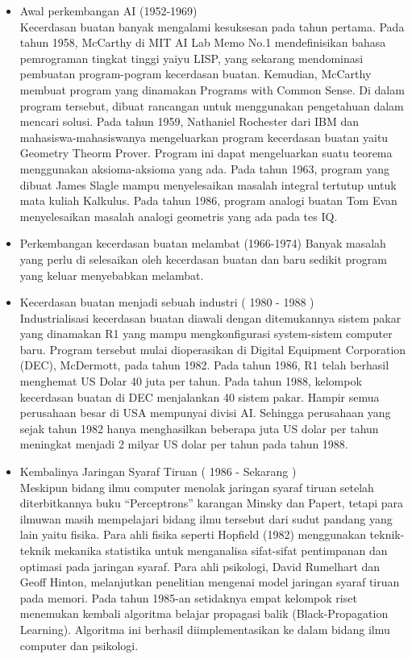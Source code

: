 \begin{enumerate}
\begin{itemize}
\item Awal perkembangan AI (1952-1969)\\
Kecerdasan buatan banyak mengalami kesuksesan pada tahun pertama. 
Pada tahun 1958, McCarthy di MIT AI Lab Memo No.1 mendefinisikan bahasa pemrograman tingkat tinggi yaiyu LISP, yang sekarang mendominasi pembuatan program-pogram kecerdasan buatan. Kemudian, McCarthy membuat program yang dinamakan Programs with Common Sense. Di dalam program tersebut, dibuat rancangan untuk menggunakan pengetahuan dalam mencari solusi.
Pada tahun 1959, Nathaniel Rochester dari IBM dan mahasiswa-mahasiswanya mengeluarkan program kecerdasan buatan yaitu Geometry Theorm Prover. Program ini dapat mengeluarkan suatu teorema menggunakan aksioma-aksioma yang ada.
Pada tahun 1963, program yang dibuat James Slagle mampu menyelesaikan masalah integral tertutup untuk mata kuliah Kalkulus.
Pada tahun 1986, program analogi buatan Tom Evan menyelesaikan masalah analogi geometris yang ada pada tes IQ.

\item Perkembangan kecerdasan buatan melambat (1966-1974)
Banyak masalah yang perlu di selesaikan oleh kecerdasan buatan dan baru sedikit program yang keluar menyebabkan melambat.

\item Kecerdasan buatan menjadi sebuah industri ( 1980 - 1988 )\\
Industrialisasi kecerdasan buatan diawali dengan ditemukannya sistem pakar yang dinamakan R1 yang mampu mengkonfigurasi system-sistem computer baru. Program tersebut mulai dioperasikan di Digital Equipment Corporation (DEC), McDermott, pada tahun 1982.
Pada tahun 1986, R1 telah berhasil menghemat US Dolar 40 juta per tahun.
Pada tahun 1988, kelompok kecerdasan buatan di DEC menjalankan 40 sistem pakar. Hampir semua perusahaan besar di USA mempunyai divisi AI. Sehingga perusahaan yang sejak tahun 1982 hanya menghasilkan beberapa juta US dolar per tahun meningkat menjadi 2 milyar US dolar per tahun pada tahun 1988.

\item Kembalinya Jaringan Syaraf Tiruan ( 1986 - Sekarang )\\
Meskipun bidang ilmu computer menolak jaringan syaraf tiruan setelah diterbitkannya buku “Perceptrons” karangan Minsky dan Papert, tetapi para ilmuwan masih mempelajari bidang ilmu tersebut dari sudut pandang yang lain yaitu fisika. Para ahli fisika seperti Hopfield (1982) menggunakan teknik-teknik mekanika statistika untuk menganalisa sifat-sifat pentimpanan dan optimasi pada jaringan syaraf. Para ahli psikologi, David Rumelhart dan Geoff Hinton, melanjutkan penelitian mengenai model jaringan syaraf tiruan pada memori.
Pada tahun 1985-an setidaknya empat kelompok riset menemukan kembali algoritma belajar propagasi balik (Black-Propagation Learning). Algoritma ini berhasil diimplementasikan ke dalam bidang ilmu computer dan psikologi.


\end{itemize}
\end{enumerate}
